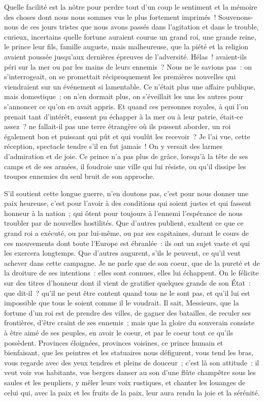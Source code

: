 \documentclass[french,twoside]{book} %
\begin{document}
Quelle facilité est la nôtre pour perdre tout d’un coup le sentiment et la mémoire des choses dont nous nous sommes vus le plus fortement imprimés ! Souvenons-nous de ces jours tristes que nous avons passés dans l’agitation et dans le trouble, curieux, incertains quelle fortune auraient courue un grand roi, une grande reine, le prince leur fils, famille auguste, mais malheureuse, que la piété et la religion avaient poussée jusqu’aux dernières épreuves de l’adversité. Hélas ! avaient-ils péri sur la mer ou par les mains de leurs ennemis ? Nous ne le savions pas : on s’interrogeait, on se promettait réciproquement les premières nouvelles qui viendraient sur un événement si lamentable. Ce n’était plus une affaire publique, mais domestique ; on n’en dormait plus, on s’éveillait les uns les autres pour s’annoncer ce qu’on en avait appris. Et quand ces personnes royales, à qui l’on prenait tant d’intérêt, eussent pu échapper à la mer ou à leur patrie, était-ce assez ? ne fallait-il pas une terre étrangère où ils pussent aborder, un roi également bon et puissant qui pût et qui voulût les recevoir ? Je l’ai vue, cette réception, spectacle tendre s’il en fut jamais ! On y versait des larmes d’admiration et de joie. Ce prince n’a pas plus de grâce, lorsqu’à la tête de ses camps et de ses armées, il foudroie une ville qui lui résiste, ou qu’il dissipe les troupes ennemies du seul bruit de son approche.\par
S'il soutient cette longue guerre, n’en doutons pas, c’est pour nous donner une paix heureuse, c’est pour l’avoir à des conditions qui soient justes et qui fassent honneur à la nation ; qui ôtent pour toujours à l’ennemi l’espérance de nous troubler par de nouvelles hostilités. Que d’autres publient, exaltent ce que ce grand roi a exécuté, ou par lui-même, ou par ses capitaines, durant le cours de ces mouvements dont toute l’Europe est ébranlée : ils ont un sujet vaste et qui les exercera longtemps. Que d’autres augurent, s’ils le peuvent, ce qu’il veut achever dans cette campagne. Je ne parle que de son coeur, que de la pureté et de la droiture de ses intentions : elles sont connues, elles lui échappent. On le félicite sur des titres d’honneur dont il vient de gratifier quelques grands de son État : que dit-il ? qu’il ne peut être content quand tous ne le sont pas, et qu’il lui est impossible que tous le soient comme il le voudrait. Il sait, Messieurs, que la fortune d’un roi est de prendre des villes, de gagner des batailles, de reculer ses frontières, d’être craint de ses ennemis ; mais que la gloire du souverain consiste à être aimé de ses peuples, en avoir le coeur, et par le coeur tout ce qu’ils possèdent. Provinces éloignées, provinces voisines, ce prince humain et bienfaisant, que les peintres et les statuaires nous défigurent, vous tend les bras, vous regarde avec des yeux tendres et pleins de douceur ; c’est là son attitude : il veut voir vos habitants, vos bergers danser au son d’une flûte champêtre sous les saules et les peupliers, y mêler leurs voix rustiques, et chanter les louanges de celui qui, avec la paix et les fruits de la paix, leur aura rendu la joie et la sérénité.\par
\end{document}
